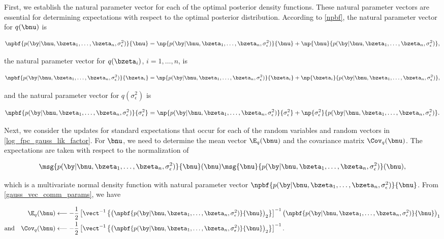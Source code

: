 \documentclass[12pt]{article}
\def\sigsqeps{\sigma^2_{\epsilon}}
\theoremstyle{plain}
\theoremstyle{definition}
\theoremstyle{remark}
\begin{document}
First, we establish the natural parameter vector for each of the optimal posterior density functions. These natural
parameter vectors are essential for determining expectations with respect to the optimal posterior distribution.
According to \eqref{npbf}, the natural parameter vector for $q (\bnu)$ is

\[
	\npbf{p (\by | \bnu, \bzeta_1, \dots, \bzeta_n, \sigsqeps)}{\bnu} =
		\np{p (\by | \bnu, \bzeta_1, \dots, \bzeta_n, \sigsqeps)}{\bnu}
		+ \np{\bnu}{p (\by | \bnu, \bzeta_1, \dots, \bzeta_n, \sigsqeps)},
\]

\noindent the natural parameter vector for $q (\bzeta_i)$, $i = 1, \dots, n$, is

\[
	\npbf{p (\by | \bnu, \bzeta_1, \dots, \bzeta_n, \sigsqeps)}{\bzeta_i} =
		\np{p (\by | \bnu, \bzeta_1, \dots, \bzeta_n, \sigsqeps)}{\bzeta_i}
		+ \np{\bzeta_i}{p (\by | \bnu, \bzeta_1, \dots, \bzeta_n, \sigsqeps)},
\]

\noindent and the natural parameter vector for $q(\sigsqeps)$ is

\[
	\npbf{p (\by | \bnu, \bzeta_1, \dots, \bzeta_n, \sigsqeps)}{\sigsqeps} =
		\np{p (\by | \bnu, \bzeta_1, \dots, \bzeta_n, \sigsqeps)}{\sigsqeps}
		+ \np{\sigsqeps}{p (\by | \bnu, \bzeta_1, \dots, \bzeta_n, \sigsqeps)}.
\]

Next, we consider the updates for standard expectations that occur for each of
the random variables and random vectors in
\eqref{log_fpc_gauss_lik_factor}. For $\bnu$, we need to determine the mean vector $\E_q (\bnu)$
and the covariance matrix $\Cov_q (\bnu)$. The expectations are taken with respect to the normalization
of

\[
	\msg{p (\by | \bnu, \bzeta_1, \dots, \bzeta_n, \sigsqeps)}{\bnu} (\bnu)
	\msg{\bnu}{p (\by | \bnu, \bzeta_1, \dots, \bzeta_n, \sigsqeps)} (\bnu),
\]

\noindent which is a multivariate normal density function with natural parameter vector $\npbf{p (\by | \bnu, \bzeta_1,
\dots, \bzeta_n, \sigsqeps)}{\bnu}$. From \eqref{gauss_vec_comm_params}, we have

\begin{align}
\begin{split}
	\E_q (\bnu)
		&\longleftarrow
			-\frac12 \left[
				\vect^{-1} \left\{
					\left( \npbf{p (\by | \bnu, \bzeta_1, \dots, \bzeta_n, \sigsqeps)}{\bnu} \right)_2
				\right\}
			\right]^{-1} \left( \npbf{p (\by | \bnu, \bzeta_1, \dots, \bzeta_n, \sigsqeps)}{\bnu} \right)_1 \\
	\text{and} \quad
	\Cov_q (\bnu)
		&\longleftarrow
			-\frac12 \left[
				\vect^{-1} \left\{
					\left( \npbf{p (\by | \bnu, \bzeta_1, \dots, \bzeta_n, \sigsqeps)}{\bnu} \right)_2
				\right\}
			\right]^{-1}.
\end{split}
\label{mom_lik_nu}
\end{align}
\end{document}
